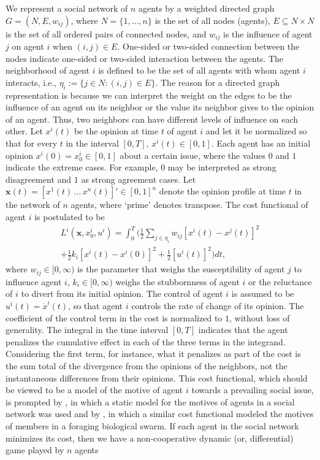 \documentclass[10pt, conference, compsocconf]{IEEEtran}
\begin{document}
We represent a social network of $n$ agents by a weighted directed graph $G=( N , E, w_{ij})$, where $N =\lbrace1,...,n\rbrace$ is the set of all nodes (agents), $E  \subseteq N  \times N $ is the set of all ordered pairs of connected nodes, and $w_{ij}$ is the influence of agent $j$ on agent $i$ when $(i,j)\in E$. One-sided or two-sided connection between the nodes indicate one-sided or two-sided interaction between the agents. The neighborhood of agent $i$ is defined to be the set of all agents with whom agent $i$ interacts, i.e., $\eta_i := \{j\in N  : (i,j)\in E\}$. The reason for a directed graph representation is because we can interpret the weight on the edges to be the influence of an agent on its neighbor or the value its neighbor gives to the opinion of an agent. Thus, two neighbors can have different levels of influence on each other. Let $x^i(t)$ be the opinion at time $t$ of agent $i$ and let it be normalized so that for every $t$ in the interval $[0,T]$, $x^i(t)\in [0,1]$. Each agent has an initial opinion $x^i(0)=x_0^i\in [0,1]$ about a certain issue, where the values $0$ and $1$ indicate the extreme cases. For example, $0$ may be interpreted as strong disagreement and $1$ as strong agreement cases. Let $\mathbf{x}(t)=[x^1(t)\,...\,x^n(t)]'\in [0,1]^n$ denote the opinion profile at time $t$  in the network of $n$ agents, where `prime' denotes transpose. The cost functional of agent $i$ is postulated to be    
\begin{multline} \label{cost}
	L^i(\mathbf{x},x_0^i,u^i) = \int_0^T \biggl( \frac{1}{2} \sum_{j\in \eta_i} w_{ij} \left[ x^i(t)-x^j(t) \right]^2 \\
	+ \frac{1}{2} k_i \left[x^i(t)-x^i(0) \right]^2 + \frac{1}{2} \left[u^i(t)\right]^2 \biggr) dt,
\end{multline}
where $w_{ij}\in [0,\infty)$ is the parameter that weighs the susceptibility of agent $j$ to influence agent $i$, $k_i\in [0,\infty)$ weighs the stubbornness of agent $i$ or the reluctance of $i$ to divert from its initial opinion. The control of agent $i$ is assumed to be $u^i(t)=\dot{x}^i(t)$, so that agent $i$ controls the rate of change of its opinion. The coefficient of the control term in the cost is normalized to $1$, without loss of generality. The integral in the time interval $[0,T]$ indicates that the agent penalizes the cumulative effect in each of the three terms in the integrand. Considering the first term, for instance, what it penalizes as part of the cost is the sum total of the divergence from the opinions of the neighbors, not the instantaneous differences from their opinions. This cost functional, which should be viewed to be a model of the motive  of agent $i$ towards a prevailing social issue, is prompted by \cite{ghaderi}, in which a static model for the motives of agents in a social network was used and by \cite{ozguler}, in which a similar cost functional modeled the motives of members in a foraging biological swarm. If each agent in the social network minimizes its cost, then we have a non-cooperative dynamic (or, differential) game played by $n$ agents 
\end{document}
